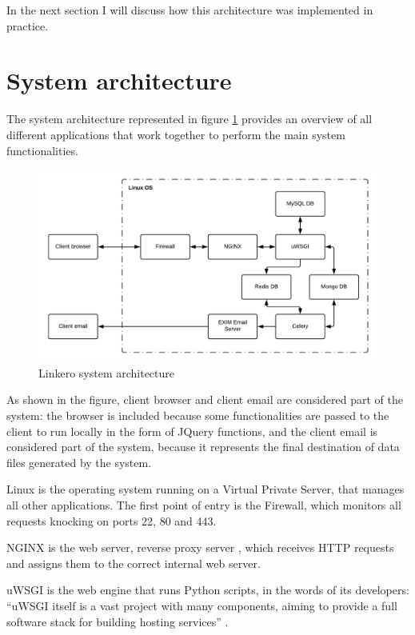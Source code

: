 In the next section I will discuss how this architecture was implemented in
practice.

\section{System architecture}
The system architecture represented in figure \ref{fig:sysarch} provides an
overview of all different applications that work together to perform the main
system functionalities.

\begin{figure}[h!]
\centering
\includegraphics[scale=0.7]{imgs/SystemArchitecture.pdf}
\caption{Linkero system architecture}
\label{fig:sysarch}
\end{figure}

As shown in the figure, client browser and client email are considered part of
the system: the browser is included because some functionalities are passed to
the client to run locally in the form of JQuery functions, and the client email
is considered part of the system, because it represents the final destination of
data files generated by the system.

Linux is the operating system running on a Virtual Private Server, that manages
all other applications. The first point of entry is the Firewall, which monitors
all requests knocking on ports 22, 80 and 443.

NGINX is the web server, reverse proxy server \cite{WikiNginx}, which receives
HTTP requests and assigns them to the correct internal web server.

uWSGI is the web engine that runs Python scripts, in the words of its
developers: ``uWSGI itself is a vast project with many components, aiming to
provide a full software stack for building hosting services'' \cite{RtduWsgi}.

